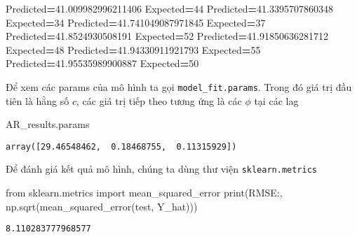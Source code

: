 \documentclass[
]{book}
\newenvironment{Shaded}{\begin{snugshade}}{\end{snugshade}}
\newcommand{\BuiltInTok}[1]{#1}
\newcommand{\DecValTok}[1]{\textcolor[rgb]{0.00,0.00,0.81}{#1}}
\newcommand{\FloatTok}[1]{\textcolor[rgb]{0.00,0.00,0.81}{#1}}
\newcommand{\ImportTok}[1]{#1}
\newcommand{\NormalTok}[1]{#1}
\newcommand{\OperatorTok}[1]{\textcolor[rgb]{0.81,0.36,0.00}{\textbf{#1}}}
\newcommand{\StringTok}[1]{\textcolor[rgb]{0.31,0.60,0.02}{#1}}
\begin{document}
\begin{Shaded}
\begin{Highlighting}[]
\NormalTok{Predicted}\OperatorTok{=}\FloatTok{41.009982996211406}\NormalTok{    Expected}\OperatorTok{=}\DecValTok{44}
\NormalTok{Predicted}\OperatorTok{=}\FloatTok{41.3395707860348}\NormalTok{      Expected}\OperatorTok{=}\DecValTok{34}
\NormalTok{Predicted}\OperatorTok{=}\FloatTok{41.741049087971845}\NormalTok{    Expected}\OperatorTok{=}\DecValTok{37}
\NormalTok{Predicted}\OperatorTok{=}\FloatTok{41.8524930508191}\NormalTok{      Expected}\OperatorTok{=}\DecValTok{52}
\NormalTok{Predicted}\OperatorTok{=}\FloatTok{41.91850636281712}\NormalTok{     Expected}\OperatorTok{=}\DecValTok{48}
\NormalTok{Predicted}\OperatorTok{=}\FloatTok{41.94330911921793}\NormalTok{     Expected}\OperatorTok{=}\DecValTok{55}
\NormalTok{Predicted}\OperatorTok{=}\FloatTok{41.95535989900887}\NormalTok{     Expected}\OperatorTok{=}\DecValTok{50}
\end{Highlighting}
\end{Shaded}

Để xem các params của mô hình ta gọi \texttt{model\_fit.params}. Trong đó giá trị đầu tiên là hằng số \(c\), các giá trị tiếp theo tương ứng là các \(\phi\) tại các lag

\begin{Shaded}
\begin{Highlighting}[]
\NormalTok{AR\_results.params}
\end{Highlighting}
\end{Shaded}

\begin{verbatim}
array([29.46548462,  0.18468755,  0.11315929])
\end{verbatim}

Để đánh giá kết quả mô hình, chúng ta dùng thư viện \texttt{sklearn.metrics}

\begin{Shaded}
\begin{Highlighting}[]
\ImportTok{from}\NormalTok{ sklearn.metrics }\ImportTok{import}\NormalTok{ mean\_squared\_error}
\BuiltInTok{print}\NormalTok{(}\StringTok{\textquotesingle{}RMSE:\textquotesingle{}}\NormalTok{, np.sqrt(mean\_squared\_error(test, Y\_hat)))}
\end{Highlighting}
\end{Shaded}

\begin{verbatim}
8.110283777968577
\end{verbatim}
\end{document}
